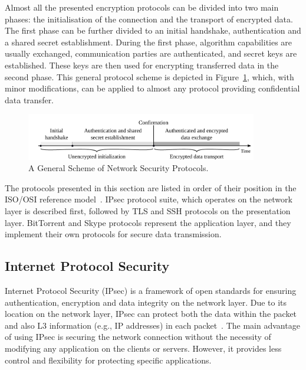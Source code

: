 Almost all the presented encryption protocols can be divided into two main phases: the initialisation of the connection and the transport of encrypted data. The first phase can be further divided to an initial handshake, authentication and a shared secret establishment. During the first phase, algorithm capabilities are usually exchanged, communication parties are authenticated, and secret keys are established. These keys are then used for encrypting transferred data in the second phase. This general protocol scheme is depicted in Figure~\ref{fig:protocols-scheme}, which, with minor modifications, can be applied to almost any protocol providing confidential data transfer.

\begin{figure}[!ht]
    \begin{center}
        \includegraphics[width=0.9\textwidth]{figures/paper-encrypted/protocols_scheme}
        \caption{A General Scheme of Network Security Protocols.}
        \label{fig:protocols-scheme}
    \end{center}
\end{figure}

The protocols presented in this section are listed in order of their position in the ISO/OSI reference model~\cite{ISO7948-1}. IPsec protocol suite, which operates on the network layer is described first, followed by TLS and SSH protocols on the presentation layer. BitTorrent and Skype protocols represent the application layer, and they implement their own protocols for secure data transmission.



\subsection{Internet Protocol Security}

Internet Protocol Security (IPsec) is a framework of open standards for ensuring authentication, encryption and data integrity on the network layer. Due to its location on the network layer, IPsec can protect both the data within the packet and also L3 information (e.g., IP addresses) in each packet~\cite{SP-800-77}. The main advantage of using IPsec is securing the network connection without the necessity of modifying any application on the clients or servers. However, it provides less control and flexibility for protecting specific applications.

